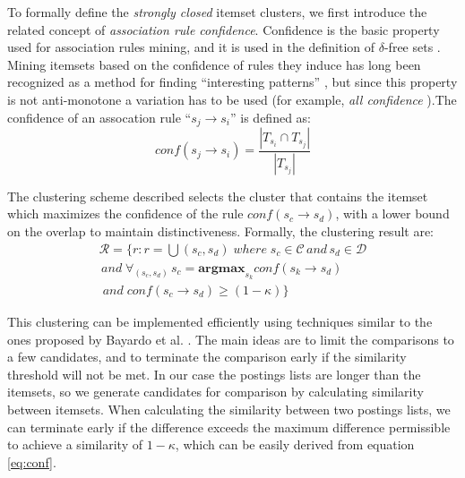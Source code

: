 \documentclass{sig-alternate}
\begin{document}
To formally define the \emph{strongly closed} itemset clusters, we first introduce the related concept of \emph{association rule confidence}. Confidence is the basic property used for association rules mining, and it is used in the definition of $\delta$-free sets \cite{boulicaut2003free}. Mining itemsets based on the confidence of rules they induce has long been recognized as a method for finding ``interesting patterns'' \cite{cohen2001finding}, but since this property is not anti-monotone a variation has to be used (for example, \emph{all confidence} \cite{kim2004ccmine}).The confidence of an assocation rule ``$s_{j} \rightarrow s_i$'' is  defined as:
\begin{equation}\label{eq:conf}conf(s_j \rightarrow s_i) = \frac{|T_{s_i} \cap T_{s_j}|}{|T_{s_j}|}\end{equation}

The clustering scheme described selects the cluster that contains the itemset which maximizes the confidence of the rule $conf(s_c \rightarrow s_d)$, with a lower bound on the overlap to maintain distinctiveness. Formally, the clustering result are: 
\begin{multline}\label{eq:strongClosedFormal}
\mathcal{R} = \{r: r = \bigcup{(s_c, s_d)}\; where\; s_c \in \mathcal{C} \, and \, s_d \in \mathcal{D} \\\,and\; \forall_{(s_c,s_d)} \, s_c = \textbf{argmax}_{s_k} conf(s_k \rightarrow s_d) \\\;and \;conf(s_c \rightarrow s_d) \ge (1 - \kappa)\}
\end{multline}

This clustering can be implemented efficiently using techniques similar to the ones proposed by Bayardo et al. \cite{bayardo2007scaling}. The main ideas are to limit the comparisons to a few candidates, and to terminate the comparison early if the similarity threshold will not be met. In our case the postings lists are longer than the itemsets, so we generate candidates for comparison by calculating similarity between itemsets. When calculating the similarity between two postings lists, we can terminate early if the difference exceeds the 
maximum difference permissible to achieve a similarity of $1-\kappa$, which can be easily derived from equation \ref{eq:conf}. 
\end{document}
